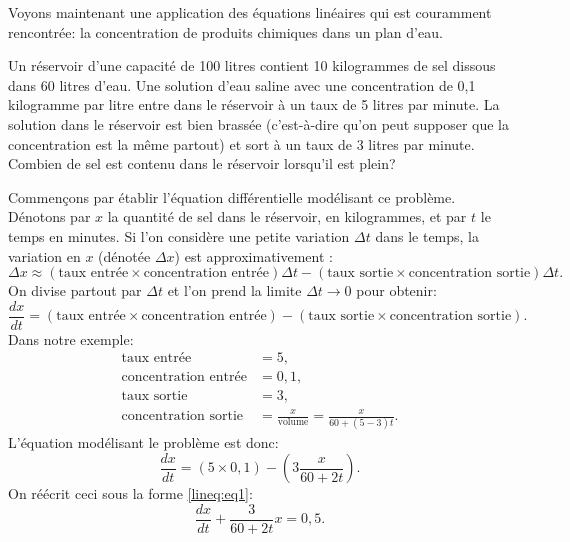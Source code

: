 \begin{example}
	Voyons maintenant une application des équations linéaires qui est couramment rencontrée: la concentration de produits chimiques dans un plan d'eau.

	\begin{mywrapfigsimp}{1.60in}{1.65in}
	\noindent
	\end{mywrapfigsimp}
	Un réservoir d'une capacité de 100 litres contient 10 kilogrammes de sel dissous dans 60 litres d'eau.  Une solution d'eau saline avec une concentration de 0,1 kilogramme par litre entre dans le réservoir à un taux de 5 litres par minute. La solution dans le réservoir est bien brassée (c'est-à-dire qu'on peut supposer que la concentration est la même partout) et sort à un taux de 3 litres par minute.  Combien de sel est contenu dans le réservoir lorsqu'il est plein?

	Commençons par établir l'équation différentielle modélisant ce problème.  Dénotons par $x$ la quantité de sel dans le réservoir, en kilogrammes,  et par $t$ le temps en minutes.  Si l'on considère une petite variation $\Delta t$ dans le temps, la variation en $x$ (dénotée $\Delta x$) est approximativement :
	\begin{equation*}
		\Delta x \approx
		(\text{taux entrée} \times \text{concentration entrée}) \Delta t -
		(\text{taux sortie} \times \text{concentration sortie}) \Delta t .
	\end{equation*}
	On divise partout par $\Delta t$ et l'on prend la limite $\Delta t \to 0$ pour obtenir:
	\begin{equation*}
		\frac{dx}{dt} =
		(\text{taux entrée} \times \text{concentration entrée})  -
		(\text{taux sortie} \times \text{concentration sortie}) .
	\end{equation*}
	Dans notre exemple:
	\begin{align*}
		\text{taux entrée} &= 5 , \\
		\text{concentration entrée} &= 0,1 , \\
		\text{taux sortie} &= 3 , \\
		\text{concentration sortie} &= \frac{x}{\text{volume}} = \frac{x}{60+(5-3)t} .
	\end{align*}
	L'équation modélisant le problème est donc:
	\begin{equation*}
		\frac{dx}{dt} =	(5 \times 0,1)  - 	\left(3 \frac{x}{60+2t}\right) .
	\end{equation*}
	On réécrit ceci sous la forme \eqref{lineq:eq1}:
	\begin{equation*}
		\frac{dx}{dt} + 	\frac{3}{60+2t} x = 	0,5 .
	\end{equation*}


\end{example}
